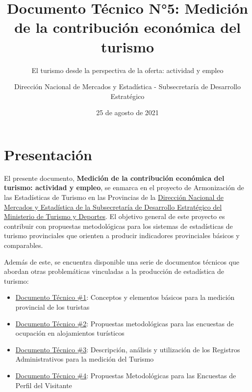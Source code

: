 \documentclass[
  openany]{book}
\title{Documento Técnico N°5: Medición de la contribución económica del turismo}
\subtitle{El turismo desde la perspectiva de la oferta: actividad y empleo}
\author{Dirección Nacional de Mercados y Estadística - Subsecretaría de Desarrollo Estratégico}
\date{25 de agosto de 2021}
\let\oldmaketitle\maketitle
\begin{document}
\maketitle


\newpage

\let\maketitle\oldmaketitle
\maketitle

{
\setcounter{tocdepth}{1}
\tableofcontents
}
\hypertarget{presentaciuxf3n}{%
\chapter*{Presentación}\label{presentaciuxf3n}}

El presente documento, \textbf{Medición de la contribución económica del turismo: actividad y empleo}, se enmarca en el proyecto de Armonización de las Estadísticas de Turismo en las Provincias de la \href{https://www.yvera.tur.ar/estadistica/}{Dirección Nacional de Mercados y Estadística de la Subsecretaría de Desarrollo Estratégico del Ministerio de Turismo y Deportes}. El objetivo general de este proyecto es contribuir con propuestas metodológicas para los sistemas de estadísticas de turismo provinciales que orienten a producir indicadores provinciales básicos y comparables.

Además de este, se encuentra disponible una serie de documentos técnicos que abordan otras problemáticas vinculadas a la producción de estadística de turismo:

\begin{itemize}
\item
  \href{https://dnme-minturdep.github.io/DT1_medicion_turismo/}{Documento Técnico \#1}: Conceptos y elementos básicos para la medición provincial de los turistas
\item
  \href{https://dnme-minturdep.github.io/DT2_encuestas/}{Documento Técnico \#2}: Propuestas metodológicas para las encuestas de ocupación en alojamientos turísticos
\item
  \href{https://dnme-minturdep.github.io/DT3_registros_adminsitrativos/}{Documento Técnico \#3}: Descripción, análisis y utilización de los Registros Administrativos para la medición del Turismo
\item
  \href{https://dnme-minturdep.github.io/DT4_perfiles/}{Documento Técnico \#4}: Propuestas Metodológicas para las Encuestas de Perfil del Visitante
\end{itemize}
\end{document}
